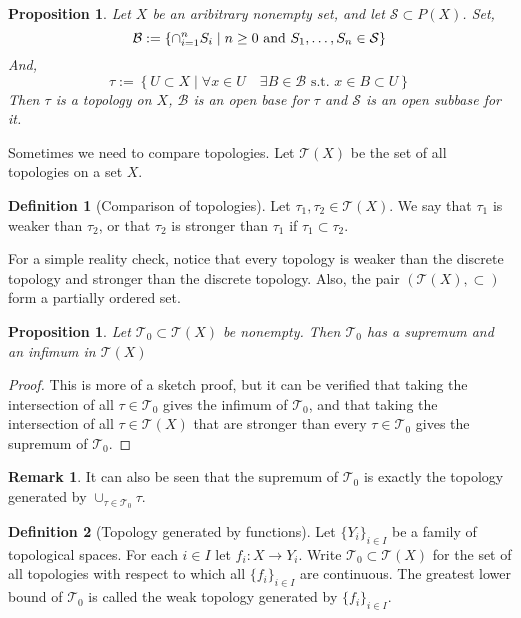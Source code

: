 \documentclass[11pt,a4paper]{article}
\theoremstyle{definition}
\newtheorem{definition}{Definition}[section]
\newtheorem{remark}{Remark}[section]
\theoremstyle{plain}
\newtheorem{proposition}[theorem]{Proposition}
\newcommand{\st}{\text{ s.t. }}
\newcommand{\set}[2]{ \left\{ #1 \mid #2 \right\} }
\begin{document}
  \begin{proposition}
    Let $X$ be an aribitrary nonempty set, 
    and let $\mathcal{S} \subset P(X)$. Set,
    \[
      \mathcal{B} := \set{\cap_{i=1}^{n}{S_i}}{n \geq 0 \textnormal{ and }
      S_1,\dots,S_n \in \mathcal{S}}
    \]
    And,
    \[
      \tau := \set{U \subset X}{\forall x \in U \quad \exists B \in 
      \mathcal{B} \st x \in B \subset U}
    \]
    Then $\tau$ is a topology on $X$, $\mathcal{B}$ is an open base for 
    $\tau$ and $\mathcal{S}$ is an open subbase for it.
  \end{proposition}

  Sometimes we need to compare topologies. Let $\mathcal{T}(X)$ be the set of
  all topologies on a set $X$.

  \begin{definition}[Comparison of topologies]
    Let $\tau_1,\tau_2 \in \mathcal{T}(X)$. We say that $\tau_1$ is weaker
    than $\tau_2$, or that $\tau_2$ is stronger than $\tau_1$ if 
    $\tau_1 \subset \tau_2$.
  \end{definition}

  For a simple reality check, notice that every topology is weaker than the
  discrete topology and stronger than the discrete topology. Also, the
  pair $(\mathcal{T}(X), \subset)$ form a partially ordered set.

  \begin{proposition}
    Let $\mathcal T_0 \subset \mathcal T(X)$ be nonempty. Then $\mathcal T_0$
    has a supremum and an infimum in $\mathcal T(X)$
  \end{proposition}
  \begin{proof}
    This is more of a sketch proof, but it can be verified that taking the
    intersection of all $\tau \in \mathcal T_0$ gives the infimum of 
    $\mathcal T_0$, and that taking the intersection of all 
    $\tau \in \mathcal T(X)$ that are stronger than every 
    $\tau \in \mathcal T_0$ gives the supremum of $\mathcal T_0$.
  \end{proof}

  \begin{remark}
    It can also be seen that the supremum of $\mathcal T_0$ is exactly the
    topology generated by $\cup_{\tau \in \mathcal T_0} \tau$.
  \end{remark}

  \begin{definition}[Topology generated by functions]
    Let $\{Y_i\}_{i \in I}$ be a family of topological spaces. For each
    $i \in I$ let $f_i \colon X \to Y_i$. Write $\mathcal{T}_0 \subset 
    \mathcal{T}(X)$ for the set of all topologies with respect to which all
    $\{f_i\}_{i \in I}$ are continuous. The greatest lower bound of 
    $\mathcal{T}_0$ is called the weak topology generated by 
    $\{f_i\}_{i \in I}$.
  \end{definition}
\end{document}
